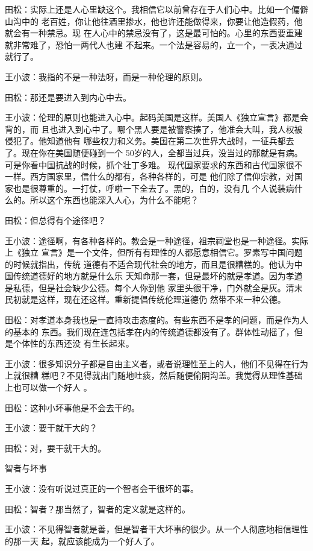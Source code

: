 田松：实际上还是人心里缺这个。我相信它以前曾存在于人们心中。比如一个偏僻山沟中的
老百姓，你让他往酒里掺水，他也许还能做得来，你要让他造假药，他就会有一种禁忌。现
在人心中的禁忌没有了，这是最可怕的。心里的东西要重建就非常难了，恐怕一两代人也建
不起来。一个法是容易的，立一个，一表决通过就行了。


王小波：我指的不是一种法呀，而是一种伦理的原则。


田松：那还是要进入到内心中去。


王小波：伦理的原则也能进入心中。起码美国是这样。美国人《独立宣言》都是会背的，而
且也进入到心中了。哪个黑人要是被警察揍了，他准会大叫，我人权被侵犯了。他知道他有
哪些权力和义务。美国在第二次世界大战时，一征兵都去了。现在你在美国随便碰到一个
50岁的人，全都当过兵，没当过的那就是有病。可是你看中国抗战的时候，抓个壮丁多难。
现代国家要求的东西和古代国家很不一样。西方国家里，信什么的都有，各种各样的，可是
他们除了信仰宗教，对国家也是很尊重的。一打仗，呼啦一下全去了。黑的，白的，没有几
个人说装病什么的。所以这个东西也能深入人心，为什么不能呢？


田松：但总得有个途径吧？


王小波：途径啊，有各种各样的。教会是一种途径，祖宗祠堂也是一种途径。实际上《独立
宣言》是一个文件，但所有有理性的人都愿意相信它。罗素写中国问题的时候就指出，传统
道德有不适合现代社会的地方，而且是很糟糕的。他认为中国传统道德好的地方就是什么乐
天知命那一套，但是最坏的就是孝道。因为孝道是私德，但是社会缺少公德。每个人你到他
家里头很干净，门外就全是灰。清末民初就是这样，现在还这样。重新提倡传统伦理道德仍
然带不来一种公德。


田松：对孝道本身我也是一直持攻击态度的。有些东西不是孝的问题，而是作为人的基本的
东西。我们现在连包括孝在内的传统道德都没有了。群体性动摇了，但是个体性的东西还没
有生长起来。


王小波：很多知识分子都是自由主义者，或者说理性至上的人，他们不见得在行为上就很糟
糕吧？不见得就出门随地吐痰，然后随便偷阴沟盖。我觉得从理性基础上也可以做一个好人
。


田松：这种小坏事他是不会去干的。


王小波：要干就干大的？


田松：对，要干就干大的。


智者与坏事


王小波：没有听说过真正的一个智者会干很坏的事。

田松：智者？那当然了，智者的定义就是这样的。


王小波：不见得智者就是善，但是智者干大坏事的很少。从一个人彻底地相信理性的那一天
起，就应该能成为一个好人了。


